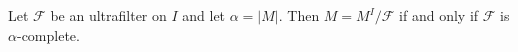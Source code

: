 Let $\mathcal{F}$ be an ultrafilter on $I$ and let $\alpha = |M|$. Then $M = M^I / \mathcal{F}$ if and only if $\mathcal{F}$ is $\alpha$-complete.
